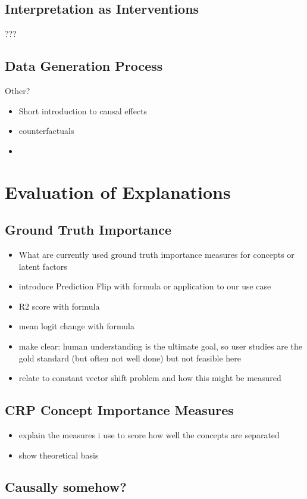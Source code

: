 \subsection{Interpretation as Interventions}
???

\subsection{Data Generation Process}

Other?

\begin{itemize}
    \item Short introduction to causal effects
    \item counterfactuals
    \item 
\end{itemize}


\section{Evaluation of Explanations}
\subsection{Ground Truth Importance}
\begin{itemize}
    \item What are currently used ground truth importance measures for concepts or latent factors
    \item introduce Prediction Flip with formula or application to our use case 
    \item R2 score with formula \cite{Sixt2020}
    \item mean logit change with formula
    \item make clear: human understanding is the ultimate goal, so user studies are the gold standard (but often not well done) but not feasible here
    \item relate to constant vector shift problem and how this might be measured
\end{itemize}
\subsection{CRP Concept Importance Measures}
\begin{itemize}
    \item explain the measures i use to score how well the concepts are separated
    \item show theoretical basis
\end{itemize}
\subsection{Causally somehow? }